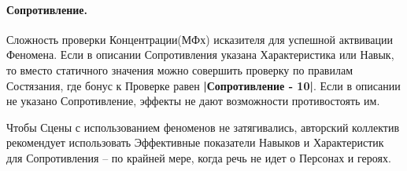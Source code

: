 \paragraph{Сопротивление.} Сложность проверки Концентрации(МФх) исказителя для успешной актвивации Феномена.
\newline Если в описании Сопротивления указана Характеристика или Навык, то вместо статичного значения можно совершить проверку по правилам Состязания, где бонус к Проверке равен \textbf{|Сопротивление - 10|}.
\newline Если в описании не указано Сопротивление, эффекты не дают возможности противостоять им.
\begin{tcolorbox}
  Чтобы Сцены с использованием феноменов не затягивались, авторский коллектив рекомендует использовать Эффективные показатели Навыков и Характеристик для Сопротивления – по крайней мере, когда речь не идет о Персонах и героях.
\end{tcolorbox}

